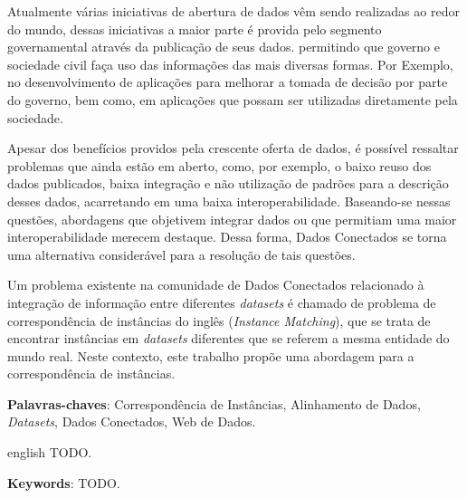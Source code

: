 
\setlength{\absparsep}{18pt} %
\begin{resumo}
Atualmente várias iniciativas de abertura de dados vêm sendo realizadas ao redor do mundo, dessas iniciativas a maior parte é provida pelo segmento governamental através da publicação de seus dados. permitindo que governo e sociedade civil faça uso das informações das mais diversas formas. Por Exemplo, no desenvolvimento de aplicações para melhorar a tomada de decisão por parte do governo, bem como, em aplicações que possam ser utilizadas diretamente pela sociedade. 

Apesar dos benefícios providos pela crescente oferta de dados, é possível ressaltar problemas que ainda estão em aberto, como, por exemplo, o baixo reuso dos dados publicados, baixa integração e não utilização de padrões para a descrição desses dados, acarretando em uma baixa interoperabilidade. Baseando-se nessas questões, abordagens que objetivem integrar dados ou que permitiam uma maior interoperabilidade  merecem destaque. Dessa forma, Dados Conectados se torna uma alternativa considerável para a resolução de tais questões.

Um problema existente na comunidade de Dados Conectados relacionado à integração de informação entre diferentes \textit{datasets} é chamado de problema de correspondência de instâncias do inglês (\textit{Instance Matching}), que se trata de encontrar instâncias em \textit{datasets} diferentes que se referem a mesma entidade do mundo real. Neste contexto, este trabalho propõe uma abordagem para a correspondência de instâncias.

 \textbf{Palavras-chaves}: Correspondência de Instâncias, Alinhamento de Dados, \textit{Datasets}, Dados Conectados, Web de Dados.
\end{resumo}

\begin{resumo}[Abstract]
 \begin{otherlanguage*}{english}
   TODO.

   \vspace{\onelineskip}
 
   \noindent 
   \textbf{Keywords}: TODO.
 \end{otherlanguage*}
\end{resumo}